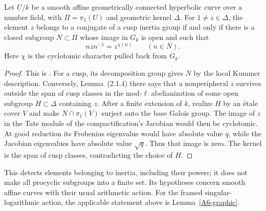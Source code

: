 \begin{proposition}
\label{A6-cyclotomic-detection}
Let $U/k$ be a smooth affine geometrically connected hyperbolic curve
over a number field, with $\Pi=\pi_1(U)$ and geometric kernel $\Delta$.
For $1\ne z\in\Delta$, the element $z$ belongs to a conjugate of a cusp
inertia group if and only if there is a closed subgroup $N\subset\Pi$
whose image in $G_k$ is open and such that
\[
 nzn^{-1}=z^{\chi(n)}\qquad(n\in N).
\]
Here $\chi$ is the cyclotomic character pulled back from $G_k$.
\end{proposition}
\begin{proof}
This is \cite[Theorem (2.1.1), pp.~94--97]{Nakamura1994A567}.
For a cusp, its decomposition group gives $N$ by the local Kummer
description. Conversely, Lemma~(2.1.4) there says that a nonperipheral
$z$ survives outside the span of cusp classes in the mod-$\ell$
abelianization of some open subgroup $H\subset\Delta$ containing $z$.
After a finite extension of $k$, realize $H$ by an \'etale cover $V$
and make $N\cap\pi_1(V)$ surject onto the base Galois group.
The image of $z$ in the Tate module of the compactification's Jacobian
would then be cyclotomic. At good reduction its Frobenius eigenvalue
would have absolute value $q$, while the Jacobian eigenvalues have
absolute value $\sqrt q$. Thus that image is zero. The kernel is the
span of cusp classes, contradicting the choice of $H$.
\end{proof}
This detects elements belonging to inertia, including their powers;
it does not make all procyclic subgroups into a finite set. Its
hypotheses concern smooth affine curves with their usual arithmetic
action. For the framed singular-logarithmic action, the applicable
statement above is Lemma~\ref{A6-graphic}.

